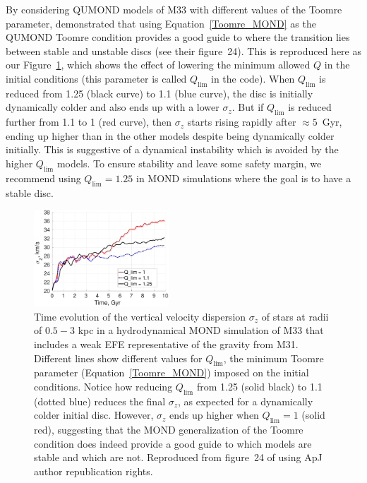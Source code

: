 \documentclass[fleqn,usenatbib,useAMS,onecolumn]{mnras} %
\begin{document}
By considering QUMOND models of M33 with different values of the Toomre parameter, \citet{Banik_2020_M33} demonstrated that using Equation~\ref{Toomre_MOND} as the QUMOND Toomre condition provides a good guide to where the transition lies between stable and unstable discs (see their figure~24). This is reproduced here as our Figure~\ref{Banik_2020_M33_Figure_Q}, which shows the effect of lowering the minimum allowed $Q$ in the initial conditions (this parameter is called $Q_\text{lim}$ in the code). When $Q_\text{lim}$ is reduced from 1.25 (black curve) to 1.1 (blue curve), the disc is initially dynamically colder and also ends up with a lower $\sigma_z$. But if $Q_\text{lim}$ is reduced further from 1.1 to 1 (red curve), then $\sigma_z$ starts rising rapidly after $\approx 5$~Gyr, ending up higher than in the other models despite being dynamically colder initially. This is suggestive of a dynamical instability which is avoided by the higher $Q_\text{lim}$ models. To ensure stability and leave some safety margin, we recommend using $Q_\text{lim} = 1.25$ in MOND simulations where the goal is to have a stable disc.

\begin{figure}
	\centering
	\includegraphics[width=0.45\textwidth]{Banik_2020_M33_Figure_24}
	\caption{Time evolution of the vertical velocity dispersion $\sigma_z$ of stars at radii of $0.5-3$ kpc in a hydrodynamical MOND simulation of M33 that includes a weak EFE representative of the gravity from M31. Different lines show different values for $Q_\text{lim}$, the minimum Toomre parameter (Equation~\ref{Toomre_MOND}) imposed on the initial conditions. Notice how reducing $Q_\text{lim}$ from 1.25 (solid black) to 1.1 (dotted blue) reduces the final $\sigma_z$, as expected for a dynamically colder initial disc. However, $\sigma_z$ ends up higher when $Q_\text{lim} = 1$ (solid red), suggesting that the MOND generalization of the Toomre condition does indeed provide a good guide to which models are stable and which are not. Reproduced from figure~24 of \citet{Banik_2020_M33} using ApJ author republication rights.}
	\label{Banik_2020_M33_Figure_Q}
\end{figure}
\end{document}
